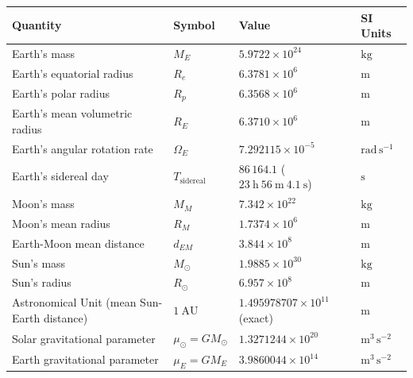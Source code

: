 \begin{center}
\renewcommand{\arraystretch}{1.3}
\begin{tabular}{@{}llll@{}}
\toprule
\textbf{Quantity} & \textbf{Symbol} & \textbf{Value} & \textbf{SI Units} \\
\midrule
Earth's mass & $M_E$ & $5.9722\times 10^{24}$ & $\mathrm{kg}$ \\
Earth's equatorial radius & $R_e$ & $6.3781\times 10^6$ & $\mathrm{m}$ \\
Earth's polar radius & $R_p$ & $6.3568\times 10^6$ & $\mathrm{m}$ \\
Earth's mean volumetric radius & $R_E$ & $6.3710\times 10^6$ & $\mathrm{m}$ \\
Earth's angular rotation rate & $\Omega_E$ & $7.292115\times 10^{-5}$ & $\mathrm{rad\,s^{-1}}$ \\
Earth's sidereal day & $T_{\text{sidereal}}$ & $86\,164.1$ ($23\ \mathrm{h}\ 56\ \mathrm{m}\ 4.1\ \mathrm{s}$) & $\mathrm{s}$ \\
Moon's mass & $M_M$ & $7.342\times 10^{22}$ & $\mathrm{kg}$ \\
Moon's mean radius & $R_M$ & $1.7374\times 10^6$ & $\mathrm{m}$ \\
Earth-Moon mean distance & $d_{EM}$ & $3.844\times 10^8$ & $\mathrm{m}$ \\
Sun's mass & $M_\odot$ & $1.9885\times 10^{30}$ & $\mathrm{kg}$ \\
Sun's radius & $R_\odot$ & $6.957\times 10^8$ & $\mathrm{m}$ \\
Astronomical Unit (mean Sun-Earth distance) & $1\ \mathrm{AU}$ & $1.495978707\times 10^{11}$ (exact) & $\mathrm{m}$ \\
Solar gravitational parameter & $\mu_\odot = GM_\odot$ & $1.3271244\times 10^{20}$ & $\mathrm{m^3\,s^{-2}}$ \\
Earth gravitational parameter & $\mu_E = GM_E$ & $3.9860044\times 10^{14}$ & $\mathrm{m^3\,s^{-2}}$ \\
\bottomrule
\end{tabular}
\end{center}
